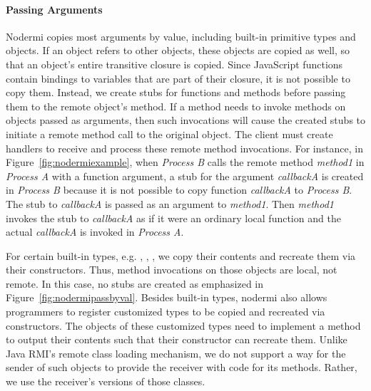 \paragraph{Passing Arguments}
Nodermi copies most arguments by value, including built-in primitive types
and objects.  If an object refers to other objects, these objects are copied
as well, so that an object's entire transitive closure is copied.
Since JavaScript functions contain bindings to variables that are part of
their closure, it is not possible to copy them.
Instead, we create stubs for functions and methods before passing them
to the remote object's method.  If a method needs to invoke
methods on objects passed as arguments, then such invocations
will cause the created stubs to initiate a remote method
call to the original object.  The client must create handlers
to receive and process these remote method invocations.
For instance, in Figure~\ref{fig:nodermiexample},
when \emph{Process B} calls the remote method \emph{method1}
in \emph{Process A} with a function argument,
a stub for the argument
\emph{callbackA} is created in \emph{Process B} because
it is not possible to copy function \emph{callbackA} to \emph{Process B}.
The stub to \emph{callbackA} is passed as an argument to
 \emph{method1}.
Then \emph{method1} invokes the stub to \emph{callbackA} as if it were an ordinary
 local function and the actual \emph{callbackA} is invoked in \emph{Process A}.


\nodrmipassbyvalfig{}

For certain built-in types, e.g. , , ,
we copy their contents and recreate them via their constructors.
Thus, method invocations on those objects are local, not remote.
In this case, no stubs are created as emphasized in Figure~\ref{fig:nodermipassbyval}.
Besides built-in types, nodermi also allows programmers to
register customized types to be copied and recreated via constructors.
The objects of these customized types need to implement a method to output
their contents such that their constructor can recreate them.
Unlike Java RMI\cite{j2eedoc}'s remote class loading mechanism, we do
not support a way for the sender of such objects to provide the receiver
with code for its methods.  Rather, we use the receiver's versions of
those classes.

\nodermipassbyreffig{}

\nodermipassstubbyreffig{}

